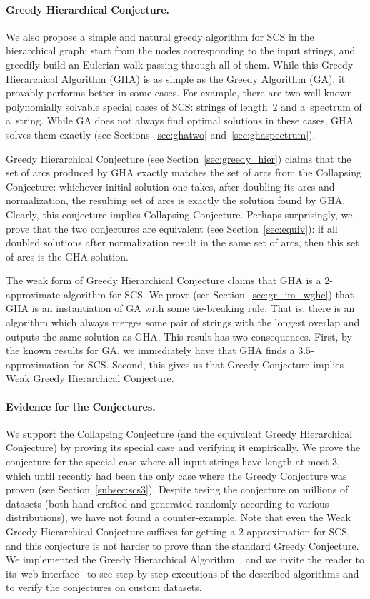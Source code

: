 \paragraph{Greedy Hierarchical Conjecture.}
We also propose a simple and natural greedy algorithm for SCS in the hierarchical graph: start from the nodes corresponding to the input strings, and greedily build an Eulerian walk passing through all of them. 
While this Greedy Hierarchical Algorithm (GHA) is as simple as the Greedy Algorithm (GA), it provably performs better in some cases. For example, there are two well-known polynomially solvable special cases of SCS: strings of length~$2$ and
a~spectrum of a~string. While GA does not always find optimal solutions in these cases, GHA solves them exactly (see Sections~\ref{sec:ghatwo} and~\ref{sec:ghaspectrum}).

Greedy Hierarchical Conjecture (see Section~\ref{sec:greedy_hier}) claims that the set of arcs produced by GHA exactly matches the set of arcs from the Collapsing Conjecture: whichever initial solution one takes, after doubling its arcs and normalization, the resulting set of arcs is exactly the solution found by GHA. Clearly, this conjecture implies Collapsing Conjecture. Perhaps surprisingly, we prove that the two conjectures are equivalent (see Section~\ref{sec:equiv}): if all doubled solutions after normalization result in the same set of arcs, then this set of arcs is the GHA solution.

The weak form of Greedy Hierarchical Conjecture claims that GHA is a 2-approximate algorithm for SCS. 
We prove (see Section~\ref{sec:gr_im_wghc}) that GHA is an instantiation of GA with some tie-breaking rule. That is, there is an algorithm which always merges some pair of strings with the longest overlap and outputs the same solution as GHA. This result has two consequences. First, by the known results for GA, we immediately have that GHA finds a $3.5$-approximation for SCS. Second, this gives us that Greedy Conjecture implies Weak Greedy Hierarchical Conjecture. 

\paragraph{Evidence for the Conjectures.}
We support the Collapsing Conjecture (and the equivalent Greedy Hierarchical Conjecture) by proving its special case and verifying it empirically. We prove the conjecture for the special case where all input strings have length at most $3$, which until recently had been the only case where the Greedy Conjecture was proven (see Section~\ref{subsec:scs3}). Despite tesing the conjecture on millions of datasets (both hand-crafted and generated randomly according to various distributions), we have not found a counter-example. Note that even the Weak Greedy Hierarchical Conjecture suffices for getting a $2$-approximation for SCS, and this conjecture is not harder to prove than the standard Greedy Conjecture.
We implemented the Greedy Hierarchical Algorithm~\cite{github}, and we invite the reader to its~web interface~\cite{webpage} to see step by step executions of the described algorithms and to verify the conjectures on
custom datasets.


